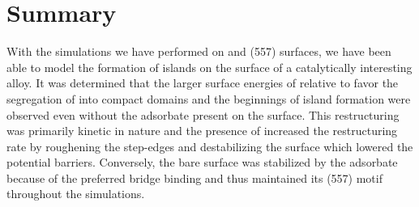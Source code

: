 \section{Summary}

With the simulations we have performed on  and  (557)
surfaces, we have been able to model the formation of  islands on the
surface of a catalytically interesting alloy. It was determined that the larger
surface energies of  relative to  favor the segregation of
 into compact domains and the beginnings of island formation were
observed even without the  adsorbate present on the surface. This
restructuring was primarily kinetic in nature and the presence of 
increased the restructuring rate by roughening the step-edges and
destabilizing the surface which lowered the potential barriers. Conversely,
the bare  surface was stabilized by the  adsorbate because of
the preferred bridge binding and thus maintained its (557) motif throughout
the simulations.

%
%


